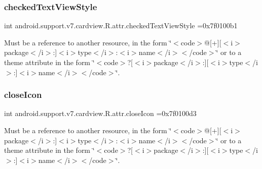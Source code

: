 \subsubsection{\texorpdfstring{checked\+Text\+View\+Style}{checkedTextViewStyle}}
{\footnotesize\ttfamily int android.\+support.\+v7.\+cardview.\+R.\+attr.\+checked\+Text\+View\+Style =0x7f0100b1\hspace{0.3cm}{\ttfamily [static]}}

Must be a reference to another resource, in the form \char`\"{}$<$code$>$@\mbox{[}+\mbox{]}\mbox{[}$<$i$>$package$<$/i$>$\+:\mbox{]}$<$i$>$type$<$/i$>$\+:$<$i$>$name$<$/i$>$$<$/code$>$\char`\"{} or to a theme attribute in the form \char`\"{}$<$code$>$?\mbox{[}$<$i$>$package$<$/i$>$\+:\mbox{]}\mbox{[}$<$i$>$type$<$/i$>$\+:\mbox{]}$<$i$>$name$<$/i$>$$<$/code$>$\char`\"{}. \mbox{\label{classandroid_1_1support_1_1v7_1_1cardview_1_1R_1_1attr_a84d3fd2c43e781b002e7e4fe6d7d7d9d}} 
\subsubsection{\texorpdfstring{close\+Icon}{closeIcon}}
{\footnotesize\ttfamily int android.\+support.\+v7.\+cardview.\+R.\+attr.\+close\+Icon =0x7f0100d3\hspace{0.3cm}{\ttfamily [static]}}

Must be a reference to another resource, in the form \char`\"{}$<$code$>$@\mbox{[}+\mbox{]}\mbox{[}$<$i$>$package$<$/i$>$\+:\mbox{]}$<$i$>$type$<$/i$>$\+:$<$i$>$name$<$/i$>$$<$/code$>$\char`\"{} or to a theme attribute in the form \char`\"{}$<$code$>$?\mbox{[}$<$i$>$package$<$/i$>$\+:\mbox{]}\mbox{[}$<$i$>$type$<$/i$>$\+:\mbox{]}$<$i$>$name$<$/i$>$$<$/code$>$\char`\"{}. \mbox{\label{classandroid_1_1support_1_1v7_1_1cardview_1_1R_1_1attr_af057b1e89a0d6c09f35f4832a983abfa}} 
